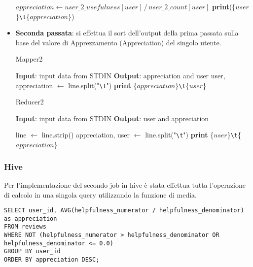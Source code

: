 \begin{itemize}
\begin{algorithm}[!ht]
\begin{algorithmic}[1]
          \STATE $appreciation \gets user\_2\_usefulness[user] \,/\, user\_2\_count[user]$
          \STATE \textbf{print}(\{$user$\}\texttt{\textbackslash t}\{$appreciation$\})
        \ENDFOR
      \end{algorithmic}
    \end{algorithm}
    \item \textbf{Seconda passata}: si effettua il sort dell'output della prima passata sulla base del valore di Apprezzamento (Appreciation) del singolo utente.
    \begin{algorithm}[!ht]
    \caption{Mapper2}
    \begin{algorithmic}[1]
    \STATE \textbf{Input}: input data from STDIN
    \STATE \textbf{Output}: appreciation and user
      \STATE user, appreciation $\gets$ line.split("\texttt{\textbackslash t}")
      \STATE \textbf{print} \{$appreciation$\}\texttt{\textbackslash t}\{$user$\}
    \ENDFOR
  \end{algorithmic}
  \end{algorithm}

  \begin{algorithm}
    \caption{Reducer2}
    \begin{algorithmic}[1]
    \STATE \textbf{Input}: input data from STDIN
    \STATE \textbf{Output}: user and appreciation
    
      \STATE line $\gets$ line.strip()
      \STATE appreciation, user $\gets$ line.split("\texttt{\textbackslash t}")
      \STATE \textbf{print} \{$user$\}\texttt{\textbackslash t}\{$appreciation$\}
    \ENDFOR
    
    \end{algorithmic}
  \end{algorithm}
  \end{itemize}

\newpage
  \subsubsection{Hive}
  Per l'implementazione del secondo job in hive è stata effettua tutta l'operazione di calcolo in una singola query utilizzando la funzione di media.

\begin{lstlisting}[style = all, style = SQLStyle]
SELECT user_id, AVG(helpfulness_numerator / helpfulness_denominator) as appreciation
FROM reviews
WHERE NOT (helpfulness_numerator > helpfulness_denominator OR helpfulness_denominator <= 0.0)
GROUP BY user_id
ORDER BY appreciation DESC;
\end{lstlisting}
  
